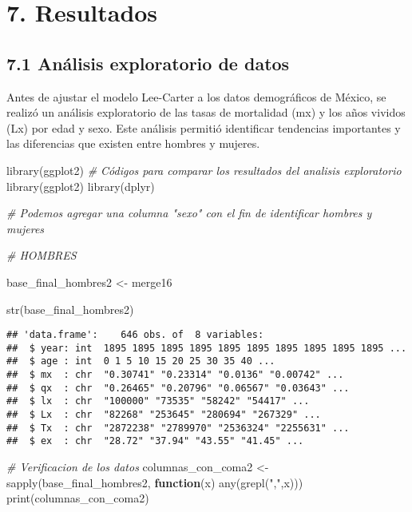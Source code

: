 \documentclass[
]{article}
\newenvironment{Shaded}{\begin{snugshade}}{\end{snugshade}}
\newcommand{\CommentTok}[1]{\textcolor[rgb]{0.56,0.35,0.01}{\textit{#1}}}
\newcommand{\ControlFlowTok}[1]{\textcolor[rgb]{0.13,0.29,0.53}{\textbf{#1}}}
\newcommand{\FunctionTok}[1]{\textcolor[rgb]{0.00,0.00,0.00}{#1}}
\newcommand{\NormalTok}[1]{#1}
\newcommand{\OtherTok}[1]{\textcolor[rgb]{0.56,0.35,0.01}{#1}}
\newcommand{\StringTok}[1]{\textcolor[rgb]{0.31,0.60,0.02}{#1}}
\begin{document}
\clearpage

\hypertarget{resultados}{%
\section{7. Resultados}\label{resultados}}

\hypertarget{anuxe1lisis-exploratorio-de-datos-1}{%
\subsection{7.1 Análisis exploratorio de
datos}\label{anuxe1lisis-exploratorio-de-datos-1}}

Antes de ajustar el modelo Lee-Carter a los datos demográficos de
México, se realizó un análisis exploratorio de las tasas de mortalidad
(mx) y los años vividos (Lx) por edad y sexo. Este análisis permitió
identificar tendencias importantes y las diferencias que existen entre
hombres y mujeres.

\begin{Shaded}
\begin{Highlighting}[]
\FunctionTok{library}\NormalTok{(ggplot2)}
\CommentTok{\# Códigos para comparar los resultados del analisis exploratorio }
\FunctionTok{library}\NormalTok{(ggplot2)}
\FunctionTok{library}\NormalTok{(dplyr)}

\CommentTok{\# Podemos agregar una columna "sexo" con el fin de identificar hombres y mujeres}

\CommentTok{\# HOMBRES}

\NormalTok{base\_final\_hombres2 }\OtherTok{\textless{}{-}}\NormalTok{ merge16}

\FunctionTok{str}\NormalTok{(base\_final\_hombres2)}
\end{Highlighting}
\end{Shaded}

\begin{verbatim}
## 'data.frame':    646 obs. of  8 variables:
##  $ year: int  1895 1895 1895 1895 1895 1895 1895 1895 1895 1895 ...
##  $ age : int  0 1 5 10 15 20 25 30 35 40 ...
##  $ mx  : chr  "0.30741" "0.23314" "0.0136" "0.00742" ...
##  $ qx  : chr  "0.26465" "0.20796" "0.06567" "0.03643" ...
##  $ lx  : chr  "100000" "73535" "58242" "54417" ...
##  $ Lx  : chr  "82268" "253645" "280694" "267329" ...
##  $ Tx  : chr  "2872238" "2789970" "2536324" "2255631" ...
##  $ ex  : chr  "28.72" "37.94" "43.55" "41.45" ...
\end{verbatim}

\begin{Shaded}
\begin{Highlighting}[]
\CommentTok{\# Verificacion de los datos }
\NormalTok{columnas\_con\_coma2 }\OtherTok{\textless{}{-}} \FunctionTok{sapply}\NormalTok{(base\_final\_hombres2, }\ControlFlowTok{function}\NormalTok{(x) }\FunctionTok{any}\NormalTok{(}\FunctionTok{grepl}\NormalTok{(}\StringTok{","}\NormalTok{,x)))}
\FunctionTok{print}\NormalTok{(columnas\_con\_coma2)}
\end{Highlighting}
\end{Shaded}
\end{document}
